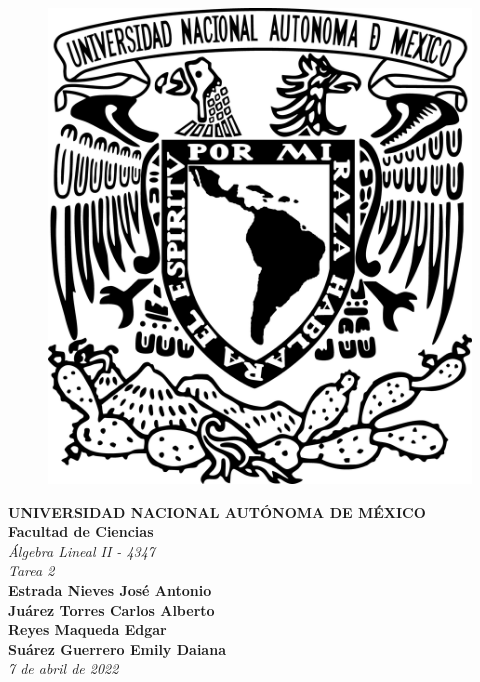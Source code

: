 \begin{center}
    \begin{figure}
        \raggedright
        \includegraphics[scale=0.2]{UNAM.png}
        \label{fig:my_label}
    \end{figure}
    
    \textbf{\Large{UNIVERSIDAD NACIONAL AUTÓNOMA DE MÉXICO}}\\
    \vspace{1cm}
    \textbf{\Large{Facultad de Ciencias}}\\
    \vspace{1cm}
    \textit{\Large{\'Algebra Lineal II - 4347}}\\
    \vspace{1cm}
    \textit{\large{Tarea 2}}\\
    \vspace{1cm}
    \textbf{\large{Estrada Nieves Jos\'e Antonio}}\\
    \vspace{1cm}
    \textbf{\large{Ju\'arez Torres Carlos Alberto}}\\
    \vspace{1cm}
    \textbf{\large{Reyes Maqueda Edgar}}\\
    \vspace{1cm}
    \textbf{\large{Su\'arez Guerrero Emily Daiana}}\\
    \vspace{1cm}
    \textit{\large{7 de abril de 2022}}
    

\end{center}
